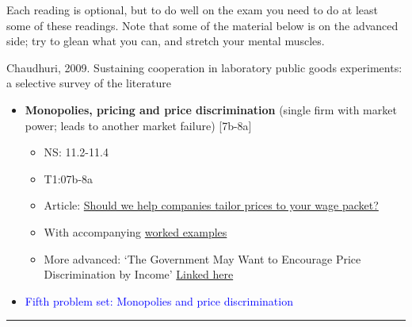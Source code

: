 \documentclass[]{article}
\providecommand{\tightlist}{%
  \setlength{\itemsep}{0pt}\setlength{\parskip}{0pt}}
\begin{document}
Each reading is optional, but to do well on the exam you need to do at
least some of these readings. Note that some of the material below is on
the advanced side; try to glean what you can, and stretch your mental
muscles.

Chaudhuri, 2009. Sustaining cooperation in laboratory public goods
experiments: a selective survey of the literature

\begin{itemize}
\tightlist
\item
  \textbf{Monopolies, pricing and price discrimination} (single firm
  with market power; leads to another market failure) {[}7b-8a{]}

  \begin{itemize}
  \tightlist
  \item
    NS: 11.2-11.4
  \item
    T1:07b-8a
  \item
    Article:
    \href{https://theconversation.com/should-we-help-companies-tailor-prices-to-your-wage-packet-47719}{Should
    we help companies tailor prices to your wage packet?}
  \item
    With accompanying
    \href{https://docs.google.com/document/d/16jos_PT9w1wGpyD5A8ZiWJ9HW6kaLOJH6EWc_AYWnkk/pub}{worked
    examples}
  \item
    More advanced: `The Government May Want to Encourage Price
    Discrimination by Income'
    \href{https://davidreinstein.wordpress.com/research-and-publications/}{Linked
    here}
  \end{itemize}
\item
  \textcolor{blue}{Fifth problem set: Monopolies and price discrimination}
\end{itemize}

\begin{center}\rule{0.5\linewidth}{\linethickness}\end{center}
\end{document}
